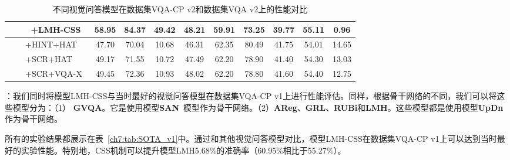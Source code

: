 \begin{table}
\begin{center}
{\begin{tabular}{| l | c c c c | c c c c| c |}
$$                ~~~~+\textbf{LMH-CSS} & \textbf{58.95} & \textbf{84.37} & \textbf{49.42} & \textbf{48.21} & 59.91 & 73.25 & 39.77 & 55.11 & \textbf{0.96}  \\
                \hline\hline
                ~~~~+HINT+HAT~\cite{selvaraju2019taking} & 47.70 & 70.04 & 10.68 & 46.31 & 62.35 & 80.49 & 41.75 & 54.01 & 14.65 \\
                ~~~~+SCR+HAT~\cite{wu2019self} & 49.17 & 71.55 & 10.72 & 47.49 & 62.20 & 78.90 & 41.40 & 54.30 & 13.03  \\
                ~~~~+SCR+VQA-X~\cite{wu2019self} & 49.45 & 72.36 & 10.93 & 48.02 & 62.20 & 78.80 & 41.60 & 54.40 & 12.75  \\
                \hline
            \end{tabular}
        } %
    \end{center}
    \caption{不同视觉问答模型在数据集VQA-CP v2和数据集VQA v2上的性能对比} %
    \label{ch7:tab:SOTA_v2}
\end{table}

\textbf{}：我们同时将模型LMH-CSS与当时最好的视觉问答模型在数据集VQA-CP v1上进行性能评估。同样，根据骨干网络的不同，我们可以将这些模型分为：（1） \textbf{GVQA}。它是使用模型\textbf{SAN}~\cite{yang2016stacked}模型作为骨干网络。（2）\textbf{AReg}、\textbf{GRL}、\textbf{RUBi}和\textbf{LMH}。这些模型都是使用模型\textbf{UpDn}作为骨干网络。

所有的实验结果都展示在表~\ref{ch7:tab:SOTA_v1}中。通过和其他视觉问答模型对比，模型LMH-CSS在数据集VQA-CP v1上可以达到当时最好的实验性能。特别地，CSS机制可以提升模型LMH5.68\%的准确率（60.95\%相比于55.27\%）。

